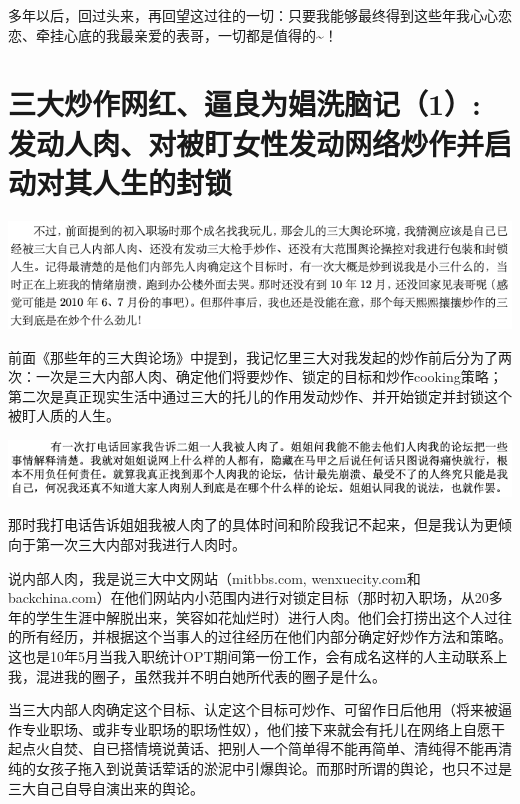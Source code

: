 \documentclass[9pt, b5paper]{article}
\begin{document}
多年以后，回过头来，再回望这过往的一切：只要我能够最终得到这些年我心心恋恋、牵挂心底的我最亲爱的表哥，一切都是值得的\textasciitilde{}！

\section{三大炒作网红、逼良为娼洗脑记（1）: 发动人肉、对被盯女性发动网络炒作并启动对其人生的封锁}
\label{sec:org6901159}

\begin{center}
\includegraphics[width=.9\linewidth]{./pic/pfp60.png}
\end{center}

前面《那些年的三大舆论场》中提到，我记忆里三大对我发起的炒作前后分为了两次：一次是三大内部人肉、确定他们将要炒作、锁定的目标和炒作cooking策略；第二次是真正现实生活中通过三大的托儿的作用发动炒作、并开始锁定并封锁这个被盯人质的人生。

\begin{center}
\includegraphics[width=.9\linewidth]{./pic/p1p51-2.png}
\end{center}

那时我打电话告诉姐姐我被人肉了的具体时间和阶段我记不起来，但是我认为更倾向于第一次三大内部对我进行人肉时。

说内部人肉，我是说三大中文网站（mitbbs.com, wenxuecity.com和backchina.com）在他们网站内小范围内进行对锁定目标（那时初入职场，从20多年的学生生涯中解脱出来，笑容如花灿烂时）进行人肉。他们会打捞出这个人过往的所有经历，并根据这个当事人的过往经历在他们内部分确定好炒作方法和策略。这也是10年5月当我入职统计OPT期间第一份工作，会有成名这样的人主动联系上我，混进我的圈子，虽然我并不明白她所代表的圈子是什么。 

当三大内部人肉确定这个目标、认定这个目标可炒作、可留作日后他用（将来被逼作专业职场、或非专业职场的职场性奴），他们接下来就会有托儿在网络上自愿干起点火自焚、自已搭情境说黄话、把别人一个简单得不能再简单、清纯得不能再清纯的女孩子拖入到说黄话荤话的淤泥中引爆舆论。而那时所谓的舆论，也只不过是三大自己自导自演出来的舆论。
\end{document}
